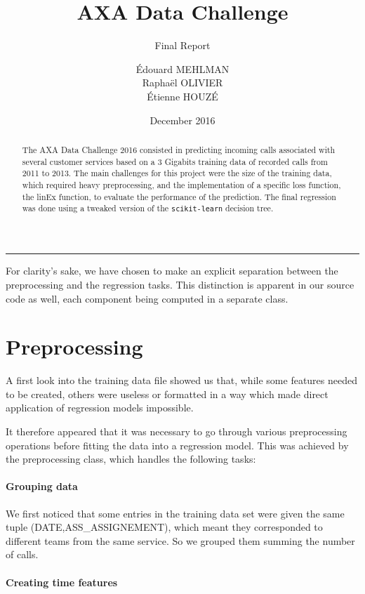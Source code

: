 \documentclass[a4paper,10pt]{article}
\title{AXA Data Challenge}
\subtitle{Final Report}
\author{Édouard MEHLMAN\\
        Raphaël OLIVIER\\
        Étienne HOUZÉ}
\date{December 2016}
\begin{document}
  \maketitle

\begin{abstract}
  The AXA Data Challenge 2016 consisted in predicting incoming calls associated with several customer services based on a 3 Gigabits training data of recorded calls from 2011 to 2013. The main challenges for this project were the size of the training data, which required heavy preprocessing, and  the implementation of a specific loss function, the linEx function, to evaluate the performance of the prediction. The final regression was done using a tweaked version of the {\tt scikit-learn} decision tree.
\end{abstract}
\begin{center}
\rule{5cm}{0.4pt}
\end{center}

For clarity's sake, we have chosen to make an explicit separation between the preprocessing and the regression tasks. This distinction is apparent in our source code as well, each component being computed in a separate class.

\part{Preprocessing}

  A first look into the training data file showed us that, while some features needed to be created, others were useless or formatted in a way which made direct application of regression models impossible.

  It therefore appeared that it was necessary to go through various preprocessing operations before fitting the data into a regression model. This was achieved by the preprocessing class, which handles the following tasks:

    \subsection{Grouping data}

    We first noticed that some entries in the training data set were given the same tuple (DATE,ASS\_ASSIGNEMENT), which meant they corresponded to different teams from the same service. So we grouped them summing the number of calls.

    \subsection{Creating time features}
\end{document}

